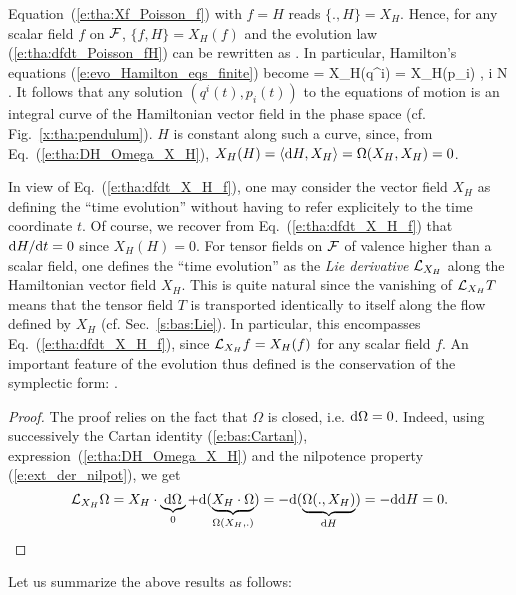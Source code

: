Equation~(\ref{e:tha:Xf_Poisson_f}) with $f=H$
reads $\{. ,H\} = X_H$. Hence, for any scalar field $f$ on $\mathcal{F}$,
$\{f,H\} = X_H(f)$ and the evolution law (\ref{e:tha:dfdt_Poisson_fH}) can be rewritten as
\be \label{e:tha:dfdt_X_H_f}
    .
\ee
In particular, Hamilton's equations (\ref{e:evo_Hamilton_eqs_finite}) become
\be \label{e:evo_Hamilton_eqs_X_H}
     = X_H(q^i) \qand {} = X_H(p_i) ,  \leq i \leq N .
\ee
It follows that any solution $(q^i(t),p_i(t))$ to the equations of motion is an
integral curve of the Hamiltonian vector field in the phase space
(cf. Fig.~\ref{x:tha:pendulum}). $H$ is constant along such a curve, since,
from Eq.~(\ref{e:tha:DH_Omega_X_H}),
$X_H(H) = \langle \mathrm{d} H, X_H \rangle = \Omega(X_H, X_H) = 0$.

In view of Eq.~(\ref{e:tha:dfdt_X_H_f}), one may consider the vector field $X_H$ as
defining the ``time evolution'' without having to refer explicitely
to the time coordinate $t$.
Of course, we recover from Eq.~(\ref{e:tha:dfdt_X_H_f})
that $\mathrm{d} H/\mathrm{d} t = 0$ since $X_H(H) = 0$.
For tensor fields on $\mathcal{F}$ of valence higher than a scalar field,
one  defines the ``time evolution'' as the
\emph{Lie derivative} $\mathcal{L}_{X_H}$ along the Hamiltonian vector field $X_H$.
This is quite natural since the vanishing of $\mathcal{L}_{X_H} T$ means
that the tensor field $T$ is transported identically to itself along the flow
defined by $X_H$ (cf. Sec.~\ref{s:bas:Lie}).
In particular, this encompasses Eq.~(\ref{e:tha:dfdt_X_H_f}), since
$\mathcal{L}_{X_H} f = X_H(f)$ for any scalar field $f$.
An important feature of the evolution thus defined is the conservation of
the symplectic form:
\be \label{e:tha:Lie_X_H_Omega}
   .
\ee
\begin{proof}
The proof relies on the fact that $\Omega$ is closed, i.e. $\mathrm{d}\Omega = 0$.
Indeed, using successively the Cartan
identity (\ref{e:bas:Cartan}), expression~(\ref{e:tha:DH_Omega_X_H})
and the nilpotence property (\ref{e:ext_der_nilpot}), we get
\[
     \mathcal{L}_{X_H} \Omega  = X_H \cdot \underbrace{\mathrm{d} \Omega}_{0}
     + \mathrm{d}(\underbrace{X_H\cdot\Omega}_{\Omega(X_H, .)})
     = - \mathrm{d}(\underbrace{\Omega(., X_H)}_{\mathrm{d} H})
     = - \mathrm{d} \mathrm{d} H = 0 .
\]
\end{proof}

Let us summarize the above results as follows:

